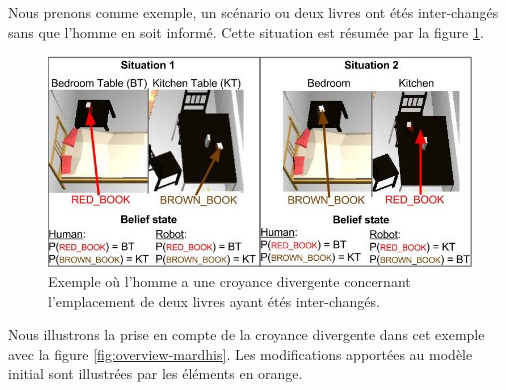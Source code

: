 \documentclass[a4paper,11pt,twoside]{StyleThese}
\begin{document}
Nous prenons comme exemple, un scénario ou deux livres ont étés inter-changés sans que l'homme en soit informé.
Cette situation est résumée par la figure \ref{fig:dbexemple}.

\begin{figure}[ht!]
 \centering
  \includegraphics[width=0.89\linewidth]{./img/dbexemple.jpg}
  \caption {Exemple où l'homme a une croyance divergente concernant l'emplacement de deux livres ayant étés inter-changés.}
  \label{fig:dbexemple}
\end{figure}


Nous illustrons la prise en compte de la croyance divergente dans cet exemple avec la figure \ref{fig:overview-mardhis}. Les modifications apportées au modèle initial sont illustrées par les éléments en
orange.
\end{document}
